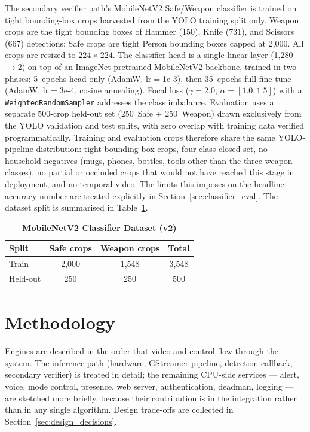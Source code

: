\documentclass{ieeeaccess}
\begin{document}
The secondary verifier path's MobileNetV2 Safe/Weapon classifier is trained on tight bounding-box crops harvested from the YOLO training split only. Weapon crops are the tight bounding boxes of Hammer (150), Knife (731), and Scissors (667) detections; Safe crops are tight Person bounding boxes capped at 2{,}000. All crops are resized to $224\times224$. The classifier head is a single linear layer (1{,}280$\to$2) on top of an ImageNet-pretrained MobileNetV2 backbone, trained in two phases: 5~epochs head-only (AdamW, lr$=$1e-3), then 35~epochs full fine-tune (AdamW, lr$=$3e-4, cosine annealing). Focal loss ($\gamma{=}2.0$, $\alpha{=}[1.0, 1.5]$) with a \texttt{WeightedRandomSampler} addresses the class imbalance. Evaluation uses a separate 500-crop held-out set (250~Safe + 250~Weapon) drawn exclusively from the YOLO validation and test splits, with zero overlap with training data verified programmatically. Training and evaluation crops therefore share the same YOLO-pipeline distribution: tight bounding-box crops, four-class closed set, no household negatives (mugs, phones, bottles, tools other than the three weapon classes), no partial or occluded crops that would not have reached this stage in deployment, and no temporal video. The limits this imposes on the headline accuracy number are treated explicitly in Section~\ref{sec:classifier_eval}. The dataset split is summarised in Table~\ref{tab:mobilenet}.

\begin{table}[ht!]
\caption{\textbf{MobileNetV2 Classifier Dataset (v2)}}
\label{tab:mobilenet}
\setlength{\tabcolsep}{4pt}
\centering\small
\begin{tabular}{|l|c|c|c|}
\hline
\textbf{Split} & \textbf{Safe crops} & \textbf{Weapon crops} & \textbf{Total} \\
\hline
Train    & 2{,}000 & 1{,}548 & 3{,}548 \\
Held-out & 250     & 250     & 500 \\
\hline
\end{tabular}
\end{table}


\section{Methodology}
\label{sec:methodology}
Engines are described in the order that video and control flow through the system. The inference path (hardware, GStreamer pipeline, detection callback, secondary verifier) is treated in detail; the remaining CPU-side services --- alert, voice, mode control, presence, web server, authentication, deadman, logging --- are sketched more briefly, because their contribution is in the integration rather than in any single algorithm. Design trade-offs are collected in Section~\ref{sec:design_decisions}.
\end{document}
